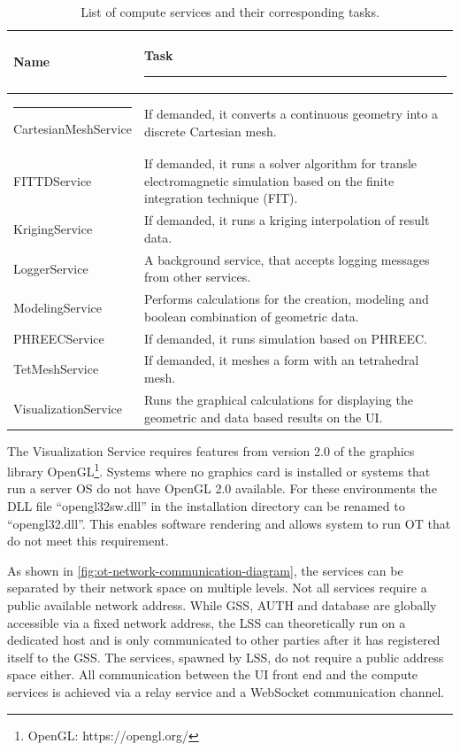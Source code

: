 \begin{table}[h!]
	\centering
	\begin{tabular}{|l | p{}|} 
		\hline
		\bfseries Name & \bfseries Task  \rule{-5pt}{2.6ex} \\
		\hline \rule{-3pt}{3ex}
		CartesianMeshService & If demanded, it converts a continuous geometry into a discrete Cartesian mesh. \\
		FITTDService & If demanded, it runs a solver algorithm for transle electromagnetic simulation based on the finite integration technique (FIT).\\
		KrigingService & If demanded, it runs a kriging interpolation of result data. \\ 
		LoggerService & A background service, that accepts logging messages from other services. \\ 
		ModelingService & Performs calculations for the creation, modeling and boolean combination of geometric data. \\ 
		PHREECService & If demanded, it runs simulation based on PHREEC. \\ 
		TetMeshService & If demanded, it meshes a form with an tetrahedral mesh.  \\ 
		VisualizationService & Runs the graphical calculations for displaying the geometric and data based results on the \ac{UI}.\\ 
		[1ex] 
		\hline
	\end{tabular}
	\caption{List of compute services and their corresponding tasks.}
	\label{tbl:ot-compute-services}
\end{table}

The Visualization Service requires features from version 2.0 of the graphics library OpenGL\footnote{OpenGL: https://opengl.org/}. Systems where no graphics card is installed or systems that run a server \ac{OS} do not have OpenGL 2.0 available. For these environments the \ac{DLL} file \enquote{opengl32sw.dll} in the installation directory can be renamed to \enquote{opengl32.dll}. This enables software rendering and allows system to run \ac{OT} that do not meet this requirement.

As shown in \autoref{fig:ot-network-communication-diagram}, the services can be separated by their network space on multiple levels. Not all services require a public available network address.
While \ac{GSS}, \ac{AUTH} and database are globally accessible via a fixed network address, the \ac{LSS} can theoretically run on a dedicated host and is only communicated to other parties after it has registered itself to the \ac{GSS}. The services, spawned by \ac{LSS}, do not require a public address space either. All communication between the \ac{UI} front end and the compute services is achieved via a relay service and a WebSocket\cite{Fette.2011} communication channel.

